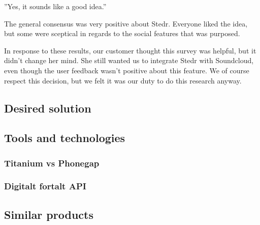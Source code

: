 	”Yes, it sounds like a good idea.”


	The general consensus was very positive about Stedr. Everyone liked the idea, but some were sceptical in regards to the social features that was purposed.

	In response to these results, our customer thought this survey was helpful, but it didn't change her mind. She still wanted us to integrate Stedr with Soundcloud, even though the user feedback wasn't positive about this feature. We of course respect this decision, but we felt it was our duty to do this research anyway.
	
	\subsection{Desired solution}
	
	
	\subsection{Tools and technologies}
		\subsubsection{Titanium vs Phonegap}
		\subsubsection{Digitalt fortalt API}

	\subsection{Similar products}

